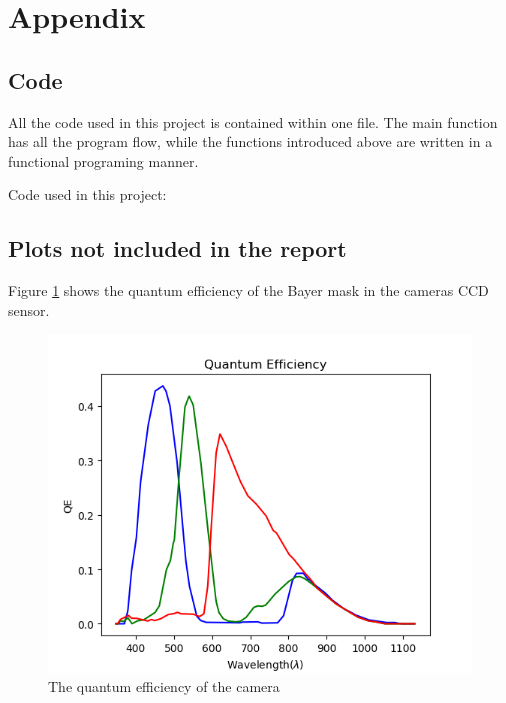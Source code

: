 \section{Appendix}


\subsection{Code}
\label{sec:appendix_code}
All the code used in this project is contained within one file. The main function has all the program flow, while the functions introduced above are written in a functional programing manner. 

Code used in this project: 



\subsection{Plots not included in the report}
\label{sec:appendix_plots}

Figure \ref{fig:quantum_efficiency_camera} shows the quantum efficiency of the Bayer mask in the cameras CCD sensor. 
\begin{figure}[h]
    \centering
    \includegraphics[width=1\textwidth]{Plots/quantum_effiency.png}
    \caption{The quantum efficiency of the camera}
    \label{fig:quantum_efficiency_camera}
\end{figure}


